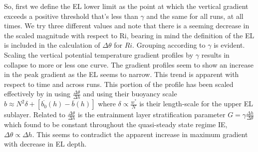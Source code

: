 So, first we define the \acs{EL} lower limit as the point at which the vertical gradient exceeds a positive threshold that's less than $\gamma$ and the same for all runs, at all times. We try three different values and note that there is a seeming decrease in the scaled magnitude with respect to \acs{Ri}, bearing in mind the definition of the \acs{EL} is included in the calculation of $\Delta \theta$ for $Ri$. Grouping according to $\gamma$ is evident.\\

Scaling the vertical potential temperature gradient profiles by $\gamma$ results in collapse to more or less one curve.  The gradient profiles seem to show an increase in the peak gradient as the \acs{EL} seems to narrow. This trend is apparent with respect to time and across runs.  This portion of the profile has been scaled effectively by \citeauthor{Sorbjan1} in \cite{Sorbjan1} using $\frac{\Delta \theta}{\Delta h}$ and \citeauthor{GarciaMellado} using their buoyancy scale $b \approx N^{2} \delta + [\overline{b_{0}}(h) - \overline{b}(h)]$ where $\delta \propto \frac{w^{*}}{N}$ is their length-scale for the upper \acs{EL} sublayer.  Related to $\frac{\Delta \theta}{\Delta h}$ is the entrainment layer stratification parameter $G = \gamma \frac{\Delta h}{\Delta \theta}$ which \citeauthor{FedConzMir04} found to be constant throughout the quasi-steady state regime IE, $\Delta \theta \propto \Delta h$.  This seems to contradict the apparent increase in maximum gradient with decrease in \acs{EL} depth.


\endinput

Any text after an \endinput is ignored.
You could put scraps here or things in progress.
